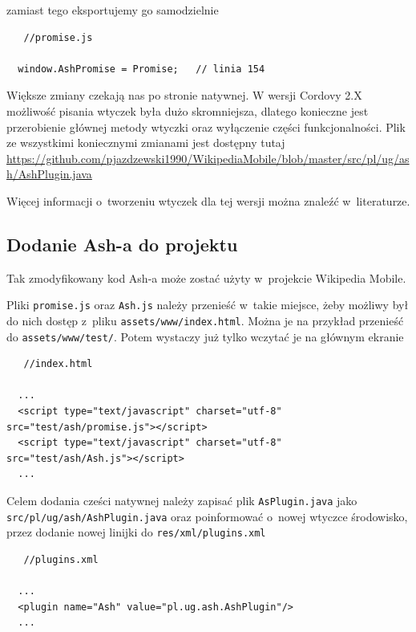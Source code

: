 \documentclass[brudnopis]{xmgr}
\begin{document}
zamiast tego eksportujemy go samodzielnie 

\begin{lstlisting}
   //promise.js
  
  window.AshPromise = Promise;   // linia 154

\end{lstlisting}

Większe zmiany czekają nas po stronie natywnej. W wersji Cordovy 2.X możliwość pisania wtyczek była dużo skromniejsza, dlatego konieczne jest przerobienie głównej metody wtyczki oraz wyłączenie części funkcjonalności. Plik ze wszystkimi koniecznymi zmianami jest dostępny tutaj \url{https://github.com/pjazdzewski1990/WikipediaMobile/blob/master/src/pl/ug/ash/AshPlugin.java}

Więcej informacji o~tworzeniu wtyczek dla tej wersji można znaleźć w~literaturze\cite{Ghatol-Patel}.

\subsection{Dodanie Ash-a do projektu}

Tak zmodyfikowany kod Ash-a może zostać użyty w~projekcie Wikipedia Mobile.

Pliki \texttt{promise.js} oraz \texttt{Ash.js} należy przenieść w~takie miejsce, żeby możliwy był do nich dostęp z~pliku \texttt{assets/www/index.html}. Można je na przykład przenieść do \texttt{assets/www/test/}. Potem wystaczy już tylko wczytać je na głównym ekranie 

\begin{lstlisting}
   //index.html
  
  ...
  <script type="text/javascript" charset="utf-8" src="test/ash/promise.js"></script>
  <script type="text/javascript" charset="utf-8" src="test/ash/Ash.js"></script>
  ...

\end{lstlisting}

Celem dodania cześci natywnej należy zapisać plik \texttt{AsPlugin.java} jako \texttt{src/pl/ug/ash/AshPlugin.java} oraz poinformować o~nowej wtyczce środowisko, przez dodanie nowej linijki do \texttt{res/xml/plugins.xml}

\begin{lstlisting}
   //plugins.xml
  
  ...
  <plugin name="Ash" value="pl.ug.ash.AshPlugin"/>
  ...

\end{lstlisting}
\end{document}
